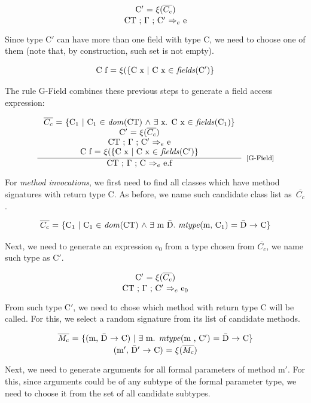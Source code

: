 \documentclass[tese,capa,english]{texufpel}
\begin{document}
\[
\stackanchor{\textrm{C$'$ = $\xi$($\overline{C_c}$)}}
            {\textrm{CT ; $\Gamma$ ; C$'$ $\Rightarrow_e$ e}}
\]

Since type C$'$ can have more than one field with type C, we need to choose one of them (note that, by construction, such set is not empty).

\[
\textrm{C f = $\xi$(\{C x $\mid$ C x $\in$ \emph{fields}(C$'$)\}}
\]

The rule {\footnotesize G-Field} combines these previous steps to generate a field access expression:

\[
\inference{\textrm{$\overline{C_c}$ = \{C$_1$ $\mid$ C$_1$ $\in$ \emph{dom}(CT) $\land$ $\exists$ x. C x $\in$ \emph{fields}(C$_1$)\}} \\
           \textrm{C$'$ = $\xi$($\overline{C_c}$)} \\
           \textrm{CT ; $\Gamma$ ; C$'$ $\Rightarrow_e$ e} \\
           \textrm{C f = $\xi$(\{C x $\mid$ C x $\in$ \emph{fields}(C$'$)\}}}
          {\textrm{CT ; $\Gamma$ ; C $\Rightarrow_e$ e.f}}[\footnotesize{[G-Field]}]
\]
        
For \emph{method invocations}, we first need to find all classes which have method signatures with return type C. As before, we name such candidate class list as~$\overline{C_c}$.

\[
\textrm{$\overline{C_c}$ = \{C$_1$ $\mid$ C$_1$ $\in$ \emph{dom}(CT) $\land$ $\exists$ m \={D}. \emph{mtype}(m, C$_1$) = \={D} $->$ C\}}
\]

Next, we need to generate an expression e$_0$ from a type chosen from $\overline{C_c}$, we name such type as C$'$.

\[
\stackanchor{\textrm{C$'$ = $\xi$($\overline{C_c}$)}}
            {\textrm{CT ; $\Gamma$ ; C$'$ $\Rightarrow_e$ e$_0$}}
\]

From such type C$'$, we need to chose which method with return type C will be called. For this, we select a random signature from its list of candidate methods. 

\[
\stackanchor{\textrm{$\overline{M_c}$ = \{(m, \={D} $->$ C) $\mid$ $\exists$ m. \emph{mtype}(m , C$'$) = \={D} $->$ C\}}}
            {\textrm{(m$'$, \={D}$'$ $->$ C) = $\xi$($\overline{M_c}$)}}
\]

Next, we need to generate arguments for all formal parameters of method m$'$. For this, since arguments could be of any subtype of the formal parameter type, we need to choose it from the set of all candidate subtypes.
\end{document}
